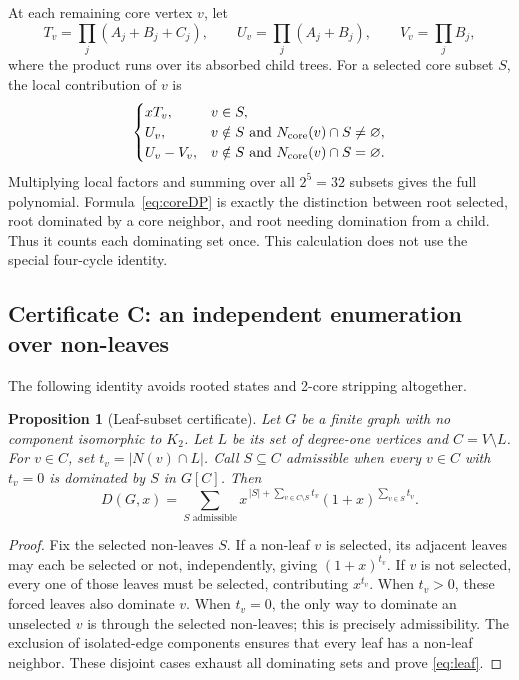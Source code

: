 \documentclass[11pt]{article}
\numberwithin{equation}{section}
\newtheorem{proposition}[theorem]{Proposition}
\theoremstyle{definition}
\newcommand{\D}{D}
\begin{document}
At each remaining core vertex \(v\), let
\[
 T_v=\prod_j(A_j+B_j+C_j),\qquad
 U_v=\prod_j(A_j+B_j),\qquad V_v=\prod_j B_j,
\]
where the product runs over its absorbed child trees. For a selected
core subset \(S\), the local contribution of \(v\) is
\begin{equation}\label{eq:coreDP}
 \begin{cases}
 xT_v,&v\in S,\\
 U_v,&v\notin S\text{ and }N_{\rm core}(v)\cap S\ne\varnothing,\\
 U_v-V_v,&v\notin S\text{ and }N_{\rm core}(v)\cap S=\varnothing.
 \end{cases}
\end{equation}
Multiplying local factors and summing over all \(2^5=32\) subsets gives
the full polynomial. Formula~\eqref{eq:coreDP} is exactly the distinction
between root selected, root dominated by a core neighbor, and root
needing domination from a child. Thus it counts each dominating set
once. This calculation does not use the special four-cycle identity.

\subsection{Certificate C: an independent enumeration over non-leaves}

The following identity avoids rooted states and 2-core stripping
altogether.

\begin{proposition}[Leaf-subset certificate]\label{prop:leaf}
Let \(G\) be a finite graph with no component isomorphic to \(K_2\).
Let \(L\) be its set of degree-one vertices and \(C=V\setminus L\).
For \(v\in C\), set \(t_v=|N(v)\cap L|\). Call \(S\subseteq C\)
admissible when every \(v\in C\) with \(t_v=0\) is dominated by \(S\)
in \(G[C]\). Then
\begin{equation}\label{eq:leaf}
 \D(G,x)=\sum_{S\text{ admissible}}
 x^{\,|S|+\sum_{v\in C\setminus S}t_v}
 (1+x)^{\sum_{v\in S}t_v}.
\end{equation}
\end{proposition}
\begin{proof}
Fix the selected non-leaves \(S\). If a non-leaf \(v\) is selected,
its adjacent leaves may each be selected or not, independently, giving
\((1+x)^{t_v}\). If \(v\) is not selected, every one of those leaves
must be selected, contributing \(x^{t_v}\). When \(t_v>0\), these
forced leaves also dominate \(v\). When \(t_v=0\), the only way to
dominate an unselected \(v\) is through the selected non-leaves; this
is precisely admissibility. The exclusion of isolated-edge components
ensures that every leaf has a non-leaf neighbor. These disjoint cases
exhaust all dominating sets and prove \eqref{eq:leaf}.
\end{proof}
\end{document}
